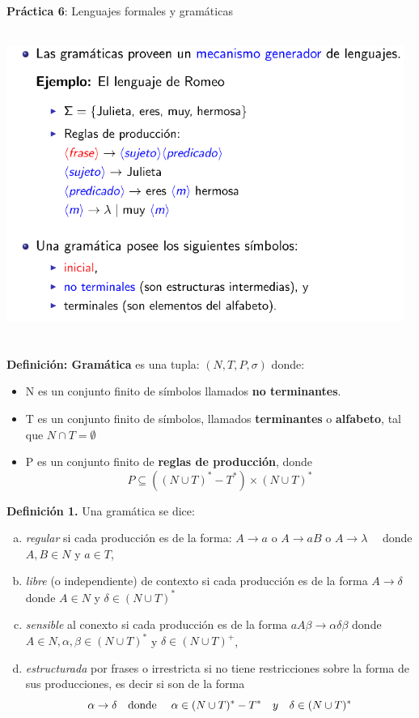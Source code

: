 \documentclass{article}
\begin{document}
\begin{center}
\large \textbf{Práctica 6}: Lenguajes formales y gramáticas
\end{center}
\graphicspath{ {./img/} }
\includegraphics[width=13cm, height=10cm]{1.png} \\ \\
\textbf{Definición: Gramática} es una tupla: $(N,T,P,\sigma)$ donde: \\
\begin{itemize}
  \item
    N es un conjunto finito de símbolos llamados \textbf{no terminantes}.
  \item
    T es un conjunto finito de símbolos, llamados \textbf{terminantes} o \textbf{alfabeto},
    tal que $N \cap T = \emptyset$
  \item
    P es un conjunto finito de \textbf{reglas de producción}, donde
    \[ P \subseteq ((N \cup T)^{*} - T^{*}) \times (N \cup T)^{*}\]
\end{itemize}
\textbf{Definición 1.} Una gramática se dice:
\begin{enumerate}[(a)]
\item
    \textit{regular} si cada producción es de la forma:
    $A \rightarrow a$ o $A \rightarrow aB$ o $A \rightarrow \lambda \quad$ 
    donde $A, B \in N$ y $a \in T$,
\item
    \textit{libre} (o independiente) de contexto si cada producción es de la forma 
    $A \rightarrow \delta$ donde $A \in N$ y $\delta \in (N \cup T)^*$
\item
    \textit{sensible} al conexto si cada producción es de la forma
    $aA\beta \rightarrow \alpha\delta\beta$ donde $A \in N, \alpha,\beta \in (N \cup T)^*$ y $\delta \in (N \cup T)^+$,
\item
    \textit{estructurada} por frases o irrestricta si no tiene restricciones sobre la forma de sus producciones, es decir
   si son de la forma
    \[ \alpha \rightarrow \delta \text{\quad donde \quad} \alpha \in (N \cup T)^* - T^* \quad y \quad \delta \in (N \cup T)^* \]
\end{enumerate}
\end{document}

